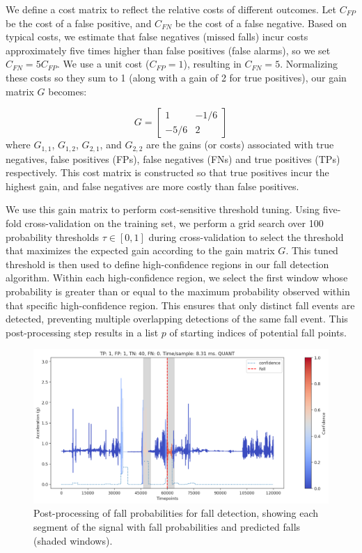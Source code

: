 \documentclass[runningheads]{llncs}
\begin{document}
We define a cost matrix to reflect the relative costs of different outcomes. Let $C_{FP}$ be the cost of a false positive, and $C_{FN}$ be the cost of a false negative.  Based on typical costs, we estimate that false negatives (missed falls) incur costs approximately five times higher than false positives (false alarms), so we set $C_{FN} = 5 C_{FP}$. We use a unit cost ($C_{FP} = 1$), resulting in $C_{FN} = 5$. Normalizing these costs so they sum to 1 (along with a gain of 2 for true positives), our gain matrix $G$ becomes:

\begin{equation}
\label{eqn:gain-matrix}
    G = \begin{bmatrix}
        1 & -1/6 \\  %
        -5/6 & 2    %
    \end{bmatrix}
\end{equation}
where $G_{1,1}$, $G_{1,2}$, $G_{2,1}$, and $G_{2,2}$ are the gains (or costs) associated with true negatives, false positives (FPs), false negatives (FNs) and true positives (TPs) respectively. This cost matrix is constructed so that true positives incur the highest gain, and false negatives are more costly than false positives.

We use this gain matrix to perform cost-sensitive threshold tuning. Using five-fold cross-validation on the training set, we perform a grid search over 100 probability thresholds $\tau \in [0, 1]$ during cross-validation to select the threshold that maximizes the expected gain according to the gain matrix $G$. This tuned threshold is then used to define high-confidence regions in our fall detection algorithm. Within each high-confidence region, we select the first window whose probability is greater than or equal to the maximum probability observed within that specific high-confidence region. This ensures that only distinct fall events are detected, preventing multiple overlapping detections of the same fall event. This post-processing step results in a list $p$ of starting indices of potential fall points.

\begin{figure}[t]
\includegraphics[width=\textwidth]{img/detection_sample.pdf}
\caption{Post-processing of fall probabilities for fall detection, showing each segment of the signal with fall probabilities and predicted falls (shaded windows).} \label{fig:detection_sample}
\end{figure}
\end{document}
